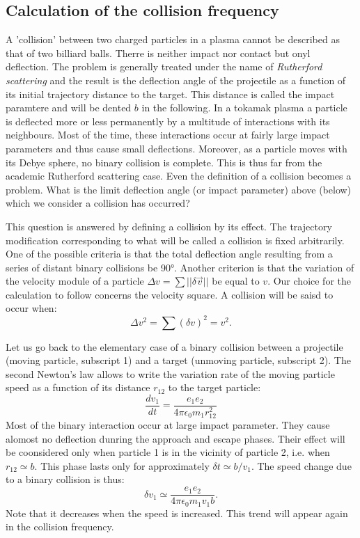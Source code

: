 						
				\subsection{Calculation of the collision frequency}
				\label{subsub:CalculDeLaFréquenceDeCollision}

A 'collision' between two charged particles in a plasma cannot be described as that of two billiard balls. Therre is neither impact nor contact but onyl deflection. The problem is generally treated under the name of \textit{Rutherford scattering} and the result is the deflection angle of the projectile as a function of its initial trajectory distance to the target. This distance is called the impact paramtere and will be dented $b$ in the following. In a tokamak plasma a particle is deflected more or less permanently by a multitude of interactions with its neighbours. Most of the time, these interactions occur at fairly large impact parameters and thus cause small deflections. Moreover, as a particle moves with its Debye sphere, no binary collision is complete. This is thus far from the academic Rutherford scattering case. Even the definition of a collision becomes a problem. What is the limit deflection angle (or impact parameter) above (below) which we consider a collision has occurred?

This question is answered by defining a collision by its effect. The trajectory modification corresponding to what will be called a collision is fixed arbitrarily. One of the possible criteria is that the total deflection angle resulting from a series of distant binary collisions be 90°. Another criterion is that the variation of the velocity module of a particle $\Delta v = \sum{||\delta \vec{v}||}$ be equal to $v$. Our choice for the calculation to follow concerns the velocity square. A collision will be saisd to occur when:
\[
		\Delta v^2 = \sum{(\delta v)^2} = v^2.
\]

Let us go back to the elementary case of a binary collision between a projectile (moving particle, subscript 1) and a target (unmoving particle, subscript 2). The second Newton's law allows to write the variation rate of the moving particle speed as a function of its distance $r_{12}$ to the target particle:
\[
		\frac{dv_1}{dt} = \frac{e_1 e_2}{4\pi\epsilon_0 m_1 r_{12}^2}
\]
Most of the binary interaction occur at large impact parameter. They cause alomost no deflection dunring the approach and escape phases. Their effect will be coonsidered only when particle 1 is in the vicinity of particle 2, i.e. when $r_{12} \simeq b$. This phase lasts only for approximately $\delta t \simeq b/v_1$. The speed change due to a binary collision is thus:
\[
		\delta v_1 \simeq \frac{e_1 e_2}{4\pi\epsilon_0 m_1 v_1 b}.
\]
Note that it decreases when the speed is increased. This trend will appear again in the collision frequency.

